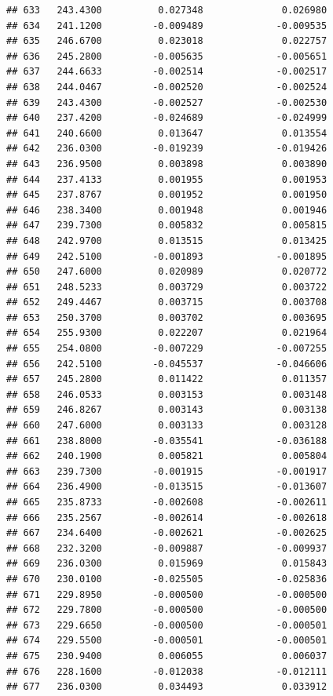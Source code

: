 \documentclass[
]{article}
\begin{document}
\begin{verbatim}
## 633   243.4300          0.027348              0.026980
## 634   241.1200         -0.009489             -0.009535
## 635   246.6700          0.023018              0.022757
## 636   245.2800         -0.005635             -0.005651
## 637   244.6633         -0.002514             -0.002517
## 638   244.0467         -0.002520             -0.002524
## 639   243.4300         -0.002527             -0.002530
## 640   237.4200         -0.024689             -0.024999
## 641   240.6600          0.013647              0.013554
## 642   236.0300         -0.019239             -0.019426
## 643   236.9500          0.003898              0.003890
## 644   237.4133          0.001955              0.001953
## 645   237.8767          0.001952              0.001950
## 646   238.3400          0.001948              0.001946
## 647   239.7300          0.005832              0.005815
## 648   242.9700          0.013515              0.013425
## 649   242.5100         -0.001893             -0.001895
## 650   247.6000          0.020989              0.020772
## 651   248.5233          0.003729              0.003722
## 652   249.4467          0.003715              0.003708
## 653   250.3700          0.003702              0.003695
## 654   255.9300          0.022207              0.021964
## 655   254.0800         -0.007229             -0.007255
## 656   242.5100         -0.045537             -0.046606
## 657   245.2800          0.011422              0.011357
## 658   246.0533          0.003153              0.003148
## 659   246.8267          0.003143              0.003138
## 660   247.6000          0.003133              0.003128
## 661   238.8000         -0.035541             -0.036188
## 662   240.1900          0.005821              0.005804
## 663   239.7300         -0.001915             -0.001917
## 664   236.4900         -0.013515             -0.013607
## 665   235.8733         -0.002608             -0.002611
## 666   235.2567         -0.002614             -0.002618
## 667   234.6400         -0.002621             -0.002625
## 668   232.3200         -0.009887             -0.009937
## 669   236.0300          0.015969              0.015843
## 670   230.0100         -0.025505             -0.025836
## 671   229.8950         -0.000500             -0.000500
## 672   229.7800         -0.000500             -0.000500
## 673   229.6650         -0.000500             -0.000501
## 674   229.5500         -0.000501             -0.000501
## 675   230.9400          0.006055              0.006037
## 676   228.1600         -0.012038             -0.012111
## 677   236.0300          0.034493              0.033912

\end{verbatim}
\end{document}
